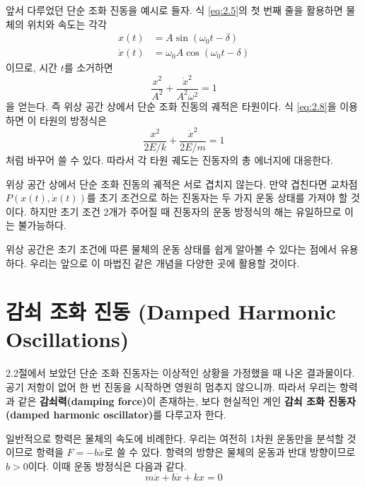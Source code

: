\documentclass[chapter, oneside, b5paper]{oblivoir}
\theoremstyle{plain}
\theoremstyle{definition}
\theoremstyle{remark}
\begin{document}
앞서 다루었던 단순 조화 진동을 예시로 들자. 식 \ref{eq:2.5}의 첫 번째 줄을 활용하면 물체의 위치와 속도는 각각
\begin{equation}
\begin{split}
    x(t) &= A\sin{(\omega_0t-\delta)} \\
    \dot{x}(t) &= \omega_0A\cos{(\omega_0t-\delta)} \label{eq:2.23}
\end{split}
\end{equation}
이므로, 시간 $t$를 소거하면
\begin{equation}
    \frac{x^2}{A^2} + \frac{\dot{x}^2}{A^2\omega^2} = 1 \label{eq:2.24}
\end{equation}
을 얻는다. 즉 위상 공간 상에서 단순 조화 진동의 궤적은 타원이다. 식 \ref{eq:2.8}을 이용하면 이 타원의 방정식은
\begin{equation}
    \frac{x^2}{2E/k} + \frac{\dot{x}^2}{2E/m} = 1 \label{eq:2.25}
\end{equation}
처럼 바꾸어 쓸 수 있다. 따라서 각 타원 궤도는 진동자의 총 에너지에 대응한다.

위상 공간 상에서 단순 조화 진동의 궤적은 서로 겹치지 않는다. 만약 겹친다면 교차점 $P(x(t), \dot{x}(t))$를 초기 조건으로 하는 진동자는 두 가지 운동 상태를 가져야 할 것이다. 하지만 초기 조건 2개가 주어질 때 진동자의 운동 방정식의 해는 유일하므로 이는 불가능하다.

위상 공간은 초기 조건에 따른 물체의 운동 상태를 쉽게 알아볼 수 있다는 점에서 유용하다. 우리는 앞으로 이 마법진 같은 개념을 다양한 곳에 활용할 것이다.

\section{감쇠 조화 진동 (Damped Harmonic Oscillations)}
2.2절에서 보았던 단순 조화 진동자는 이상적인 상황을 가정했을 때 나온 결과물이다. 공기 저항이 없어 한 번 진동을 시작하면 영원히 멈추지 않으니까. 따라서 우리는 항력과 같은 \textbf{감쇠력(damping force)}이 존재하는, 보다 현실적인 계인 \textbf{감쇠 조화 진동자(damped harmonic oscillator)}를 다루고자 한다.

일반적으로 항력은 물체의 속도에 비례한다. 우리는 여전히 1차원 운동만을 분석할 것이므로 항력을 $F=-b\dot{x}$로 쓸 수 있다. 항력의 방향은 물체의 운동과 반대 방향이므로 $b>0$이다. 이때 운동 방정식은 다음과 같다.
\begin{equation}
    m\ddot{x}+b\dot{x}+kx=0 \label{eq:2.26}
\end{equation}
\end{document}
